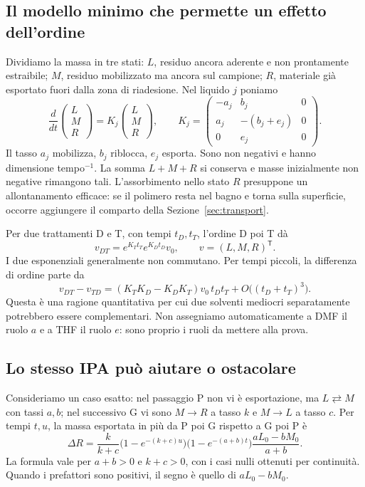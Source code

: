 \documentclass[11pt,reqno]{amsart}
\numberwithin{equation}{section}
\begin{document}
\subsection{Il modello minimo che permette un effetto dell'ordine}
Dividiamo la massa in tre stati:
$L$, residuo ancora aderente e non prontamente estraibile;
$M$, residuo mobilizzato ma ancora sul campione;
$R$, materiale gi\`a esportato fuori dalla zona di riadesione.
Nel liquido $j$ poniamo
\begin{equation}\label{eq:generator}
 \frac{d}{dt}
 \begin{pmatrix}L\\M\\R\end{pmatrix}
 =K_j\begin{pmatrix}L\\M\\R\end{pmatrix},\qquad
 K_j=\begin{pmatrix}
 -a_j&b_j&0\\a_j&-(b_j+e_j)&0\\0&e_j&0
 \end{pmatrix}.
\end{equation}
Il tasso $a_j$ mobilizza, $b_j$ riblocca, $e_j$ esporta.
Sono non negativi e hanno dimensione tempo$^{-1}$.
La somma $L+M+R$ si conserva e masse inizialmente non negative
rimangono tali. L'assorbimento nello stato $R$ presuppone un
allontanamento efficace: se il polimero resta nel bagno e torna
sulla superficie, occorre aggiungere il comparto della
Sezione~\ref{sec:transport}.

Per due trattamenti D e T, con tempi $t_D,t_T$, l'ordine D poi T
d\`a
\begin{equation}\label{eq:ordered}
 v_{DT}=e^{K_Tt_T}e^{K_Dt_D}v_0,
 \qquad v=(L,M,R)^{\mathsf T}.
\end{equation}
I due esponenziali generalmente non commutano. Per tempi piccoli,
la differenza di ordine parte da
\begin{equation}\label{eq:commutator}
 v_{DT}-v_{TD}=(K_TK_D-K_DK_T)v_0\,t_Dt_T+
 O\bigl((t_D+t_T)^3\bigr).
\end{equation}
Questa \`e una ragione quantitativa per cui due solventi
mediocri separatamente potrebbero essere complementari. Non
assegniamo automaticamente a DMF il ruolo $a$ e a THF il ruolo
$e$: sono proprio i ruoli da mettere alla prova.

\subsection{Lo stesso IPA pu\`o aiutare o ostacolare}
Consideriamo un caso esatto: nel passaggio P non vi \`e esportazione,
ma $L\rightleftarrows M$ con tassi $a,b$; nel successivo G vi sono
$M\to R$ a tasso $k$ e $M\to L$ a tasso $c$. Per tempi $t,u$,
la massa esportata in pi\`u da P poi G rispetto a G poi P \`e
\begin{equation}\label{eq:sign}
 \Delta R=
 \frac{k}{k+c}\bigl(1-e^{-(k+c)u}\bigr)
 \bigl(1-e^{-(a+b)t}\bigr)
 \frac{aL_0-bM_0}{a+b}.
\end{equation}
La formula vale per $a+b>0$ e $k+c>0$, con i casi nulli ottenuti
per continuit\`a. Quando i prefattori sono positivi, il segno
\`e quello di $aL_0-bM_0$.
\end{document}
